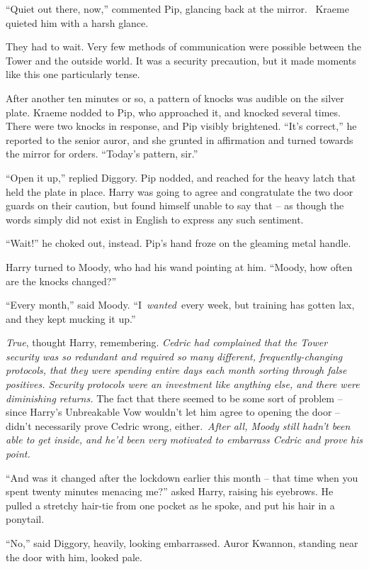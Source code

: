 ``Quiet out there, now,'' commented Pip, glancing back at the mirror.
~Kraeme quieted him with a harsh glance.

They had to wait. Very few methods of communication were possible
between the Tower and the outside world. It was a security precaution,
but it made moments like this one particularly tense.

After another ten minutes or so, a pattern of knocks was audible on the
silver plate. Kraeme nodded to Pip, who approached it, and knocked
several times. There were two knocks in response, and Pip visibly
brightened. ``It's correct,'' he reported to the senior auror, and she
grunted in affirmation and turned towards the mirror for orders.
``Today's pattern, sir.''

``Open it up,'' replied Diggory. Pip nodded, and reached for the heavy
latch that held the plate in place. Harry was going to agree and
congratulate the two door guards on their caution, but found himself
unable to say that -- as though the words simply did not exist in
English to express any such sentiment.

``Wait!'' he choked out, instead. Pip's hand froze on the gleaming metal
handle.

Harry turned to Moody, who had his wand pointing at him. ``Moody, how
often are the knocks changed?''

``Every month,'' said Moody. ``I~\emph{wanted}~every week, but training
has gotten lax, and they kept mucking it up.''

\emph{True}, thought Harry, remembering. \emph{Cedric had complained
that the Tower security was so redundant and required so many different,
frequently-changing protocols, that they were spending entire days each
month sorting through false positives. Security protocols were an
investment like anything else, and there were diminishing returns.} The
fact that there seemed to be some sort of problem -- since Harry's
Unbreakable Vow wouldn't let him agree to opening the door -- didn't
necessarily prove Cedric wrong, either.~\emph{After all, Moody still
hadn't been able to get inside, and he'd been very motivated to
embarrass Cedric and prove his point.}

``And was it changed after the lockdown earlier this month -- that time
when you spent twenty minutes menacing me?'' asked Harry, raising his
eyebrows. He pulled a stretchy hair-tie from one pocket as he spoke, and
put his hair in a ponytail.

``No,'' said Diggory, heavily, looking embarrassed. Auror Kwannon,
standing near the door with him, looked pale.

